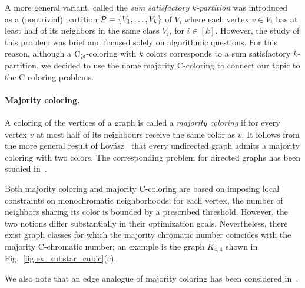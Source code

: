 \documentclass{article}
\theoremstyle{definition}
\newtheorem{definition}{Definition}
\newcommand{\mc}{\overline{\chi}_{\geqslant}}
\newcommand{\cg}{{\rm C}_{\geqslant}}
\newcommand{\cP}{{\cal P}}
\begin{document}
A more general variant, called the  {\it sum satisfactory $k$-partition} was introduced~\cite{BTV-06, GeKob-1998} as a (nontrivial) partition  $\cP=\{V_1,\dots, V_k\}$ of $V$, where each vertex $v \in V_i$ has at least half of its neighbors in the same class $V_i$, for $i \in [k]$. However, the study of this problem was brief and focused solely on algorithmic questions. For this reason, although a $\cg$-coloring with $k$ colors corresponds to a sum satisfactory $k$-partition, we decided to use the name majority C-coloring to connect our topic to the C-coloring problems.

\paragraph{Majority coloring.}
A coloring of the vertices of a graph is called a \textit{majority coloring} if for every vertex $v$ at most half of its neighbours receive the same color as $v$.
It follows from the more general result of Lovász~\cite{Lovasz} that every undirected graph admits a majority coloring with two colors. The corresponding problem for directed graphs has been studied in~\cite{CaXiYa-2025, KeOuSeZyWo-17}.

Both majority coloring and majority C-coloring are based on imposing local constraints on monochromatic neighborhoods: for each vertex, the number of neighbors sharing its color is bounded by a prescribed threshold. However, the two notions differ substantially in their optimization goals. Nevertheless, there exist graph classes for which the majority chromatic number coincides with the majority C-chromatic number; an example is the graph $K_{4,4}$ shown in Fig.~\ref{fig:ex_substar_cubic}(c). 

We also note that an edge analogue of majority coloring has been considered in~\cite{BoKaPaPlRaWo-2023}.





\end{document}
